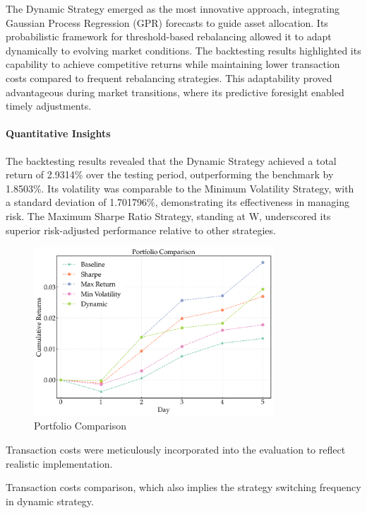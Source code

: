 The Dynamic Strategy emerged as the most innovative approach, integrating Gaussian Process Regression (GPR) forecasts to guide asset allocation. Its probabilistic framework for threshold-based rebalancing allowed it to adapt dynamically to evolving market conditions. The backtesting results highlighted its capability to achieve competitive returns while maintaining lower transaction costs compared to frequent rebalancing strategies. This adaptability proved advantageous during market transitions, where its predictive foresight enabled timely adjustments.
\paragraph{Quantitative Insights}
The backtesting results revealed that the Dynamic Strategy achieved a total return of 2.9314\% over the testing period, outperforming the benchmark by 1.8503\%. Its volatility was comparable to the Minimum Volatility Strategy, with a standard deviation of 1.701796\%, demonstrating its effectiveness in managing risk. The Maximum Sharpe Ratio Strategy, standing at W, underscored its superior risk-adjusted performance relative to other strategies.
\begin{figure}[htbp]
    \centering
    \includegraphics[width=0.8\textwidth]{figures/portfolio_comparison_final_non.png}
    \caption{Portfolio Comparison}
    \label{fig:portfolio_comparison_non_iterative}
\end{figure}

Transaction costs were meticulously incorporated into the evaluation to reflect realistic implementation. 

Transaction costs comparison, which also implies the strategy switching frequency in dynamic strategy.

